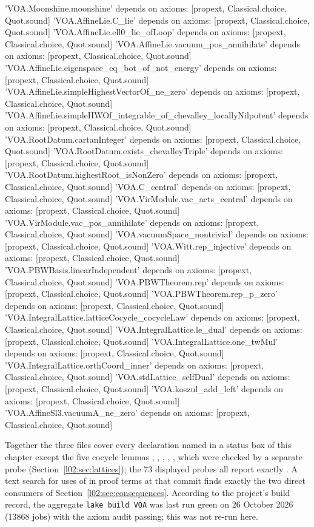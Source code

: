 \begin{plaincode}
'VOA.Moonshine.moonshine' depends on axioms: [propext, Classical.choice, Quot.sound]
'VOA.AffineLie.C_lie' depends on axioms: [propext, Classical.choice, Quot.sound]
'VOA.AffineLie.ell0_lie_ofLoop' depends on axioms: [propext, Classical.choice, Quot.sound]
'VOA.AffineLie.vacuum_pos_annihilate' depends on axioms: [propext, Classical.choice, Quot.sound]
'VOA.AffineLie.eigenspace_eq_bot_of_not_energy' depends on axioms: [propext, Classical.choice, Quot.sound]
'VOA.AffineLie.simpleHighestVectorOf_ne_zero' depends on axioms: [propext, Classical.choice, Quot.sound]
'VOA.AffineLie.simpleHWOf_integrable_of_chevalley_locallyNilpotent' depends on axioms: [propext, Classical.choice, Quot.sound]
'VOA.RootDatum.cartanInteger' depends on axioms: [propext, Classical.choice, Quot.sound]
'VOA.RootDatum.exists_chevalleyTriple' depends on axioms: [propext, Classical.choice, Quot.sound]
'VOA.RootDatum.highestRoot_isNonZero' depends on axioms: [propext, Classical.choice, Quot.sound]
'VOA.C_central' depends on axioms: [propext, Classical.choice, Quot.sound]
'VOA.VirModule.vac_acts_central' depends on axioms: [propext, Classical.choice, Quot.sound]
'VOA.VirModule.vac_pos_annihilate' depends on axioms: [propext, Classical.choice, Quot.sound]
'VOA.vacuumSpace_nontrivial' depends on axioms: [propext, Classical.choice, Quot.sound]
'VOA.Witt.rep_injective' depends on axioms: [propext, Classical.choice, Quot.sound]
'VOA.PBWBasis.linearIndependent' depends on axioms: [propext, Classical.choice, Quot.sound]
'VOA.PBWTheorem.rep' depends on axioms: [propext, Classical.choice, Quot.sound]
'VOA.PBWTheorem.rep_p_zero' depends on axioms: [propext, Classical.choice, Quot.sound]
'VOA.IntegralLattice.latticeCocycle_cocycleLaw' depends on axioms: [propext, Classical.choice, Quot.sound]
'VOA.IntegralLattice.le_dual' depends on axioms: [propext, Classical.choice, Quot.sound]
'VOA.IntegralLattice.one_twMul' depends on axioms: [propext, Classical.choice, Quot.sound]
'VOA.IntegralLattice.orthCoord_inner' depends on axioms: [propext, Classical.choice, Quot.sound]
'VOA.stdLattice_selfDual' depends on axioms: [propext, Classical.choice, Quot.sound]
'VOA.koszul_add_left' depends on axioms: [propext, Classical.choice, Quot.sound]
'VOA.AffineSl3.vacuumA_ne_zero' depends on axioms: [propext, Classical.choice, Quot.sound]
\end{plaincode}
Together the three files cover every declaration named in a status box of this chapter except the five
cocycle lemmas , , ,
, , which were checked by a separate probe (Section~\ref{l02:sec:lattices});
the 73 displayed probes all report exactly . A text search for uses of
 in proof terms at that commit finds exactly the two direct consumers of
Section~\ref{l02:sec:consequences}. According to the project's build record, the aggregate
\texttt{lake build VOA} was last run green on 26 October 2026 (13868 jobs) with the axiom audit passing; this
was not re-run here.

